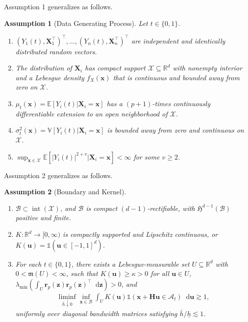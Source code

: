 \documentclass[10pt]{article}
\newtheorem{assumption}{Assumption}
\DeclareMathOperator{\setint}{int}
\newcommand{\E}{\mathbb{E}}
\newcommand{\Var}{\mathbb{V}}
\newcommand{\Indicator}{\mathds{1}}
\newcommand{\leb}{\mathfrak{m}}
\newcommand{\Haus}{\mathfrak{H}}
\newcommand{\reals}{\mathbb{R}}
\newcommand{\dif}{\mathop{}\!\mathrm{d}}
\newcommand{\bH}{\mathbf{H}}
\newcommand{\br}{\mathbf{r}}
\newcommand{\bu}{\mathbf{u}}
\newcommand{\bx}{\mathbf{x}}
\newcommand{\bX}{\mathbf{X}}
\newcommand{\bz}{\mathbf{z}}
\newcommand{\A}{\mathcal{A}}
\newcommand{\B}{\mathcal{B}}
\newcommand{\X}{\mathcal{X}}
\begin{document}
Assumption 1 generalizes as follows.

\begin{assumption}[Data Generating Process]\label{sa-assump: Sharp DGP}
    Let $t\in\{0,1\}$.
    \begin{enumerate}[label=\normalfont(\roman*),noitemsep,leftmargin=*]

    \item $(Y_1(t), \bX_1^\top)^\top,\ldots, (Y_n(t), \bX_n^\top)^\top$ are independent and identically distributed random vectors.

    \item The distribution of $\bX_i$ has compact support $\X\subseteq\mathbb{R}^d$ with nonempty interior and a Lebesgue density $f_X(\bx)$ that is continuous and bounded away from zero on $\X$.

    \item $\mu_t(\bx) = \E[Y_i(t)| \bX_i = \bx]$ has a $(p+1)$-times continuously differentiable extension to an open neighborhood of $\X$.

    \item $\sigma^2_t(\bx) = \Var[Y_i(t)|\bX_i = \bx]$ is bounded away from zero and continuous on $\X$.

    \item $\sup_{\bx \in \X}\E[|Y_i(t)|^{2+v}|\bX_i = \bx] < \infty$ for some $v \geq 2$.
    \end{enumerate}
\end{assumption}

Assumption 2 generalizes as follows.

\begin{assumption}[Boundary and Kernel]\label{sa-assump: Boundary and Kernel} $ $
    \begin{enumerate}[label=\normalfont(\roman*)]
    \item $\B\subset\setint(\X)$, and $\B$ is compact $(d-1)$-rectifiable, with $\Haus^{d-1}(\B)$ positive and finite.
    \item $K: \reals^d \to [0,\infty)$ is compactly supported and Lipschitz continuous, or $K(\bu) = \Indicator(\bu \in [-1,1]^d)$.
    \item For each $t \in \{0,1\}$, there exists a Lebesgue-measurable set $U \subseteq \reals^d$ with $0<\leb(U)<\infty$, such that $K(\bu) \geq \kappa > 0$ for all $\bu \in U$, $\lambda_{\min} (\int_U \br_p(\bz) \br_p(\bz)^{\top} \dif \bz) > 0$, and
    \begin{align*}
        \liminf_{\bar{h} \downarrow 0}\inf_{\bx \in \B} \int_{U} K(\bu) \Indicator(\bx + \bH \bu \in \A_t) \dif \bu \gtrsim 1,
    \end{align*}
    uniformly over diagonal bandwidth matrices satisfying $\bar{h}/\underline h\lesssim1$.
    \end{enumerate}
\end{assumption}
\end{document}
